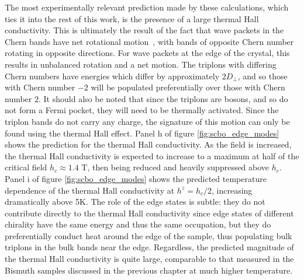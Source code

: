 \documentclass{thesis-umich}
\begin{document}
The most experimentally relevant prediction made by these calculations, which ties it into the rest of this work, is the presence of a large thermal Hall conductivity. This is ultimately the result of the fact that wave packets in the Chern bands have net rotational motion~\cite{Xiao2010}, with bands of opposite Chern number rotating in opposite directions. For wave packets at the edge of the crystal, this results in unbalanced rotation and a net motion. The triplons with differing Chern numbers have energies which differ by approximately $2D_\perp$, and so those with Chern number $-2$ will be populated preferentially over those with Chern number $2$. It should also be noted that since the triplons are bosons, and so do not form a Fermi pocket, they will need to be thermally activated. Since the triplon bands do not carry any charge, the signature of this motion can only be found using the thermal Hall effect. Panel h of figure \ref{fig:scbo_edge_modes} shows the prediction for the thermal Hall conductivity. As the field is increased, the thermal Hall conductivity is expected to increase to a maximum at half of the critical field $h_c \approx 1.4$ T, then being reduced and heavily suppressed above $h_c$. Panel i of figure \ref{fig:scbo_edge_modes} shows the predicted temperature dependence of the thermal Hall conductivity at $h^z = h_c/2$, increasing dramatically above 5K. The role of the edge states is subtle: they do not contribute directly to the thermal Hall conductivity since edge states of different chirality have the same energy and thus the same occupation, but they do preferentially conduct heat around the edge of the sample, thus populating bulk triplons in the bulk bands near the edge. Regardless, the predicted magnitude of the thermal Hall conductivity is quite large, comparable to that measured in the Bismuth samples discussed in the previous chapter at much higher temperature.
\end{document}
